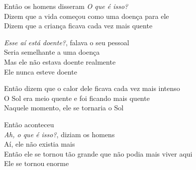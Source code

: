 \bigskip

\begin{linenumbers}\begingroup\raggedright
\noindent Então os homens disseram \emph{O que é isso?}\\
Dizem que a vida começou como uma doença para ele\\
Dizem que a criança ficava cada vez mais quente
\end{linenumbers}\endgroup

\bigskip

\begin{linenumbers}\begingroup\raggedright
\noindent \emph{Esse aí está doente?}, falava o seu pessoal\\
Seria semelhante a uma doença\\
Mas ele não estava doente realmente\\
Ele nunca esteve doente
\end{linenumbers}\endgroup

\bigskip

\begin{linenumbers}\begingroup\raggedright
\noindent Então dizem que o calor dele ficava cada vez mais intenso\\
O Sol era meio quente e foi ficando mais quente\\
Naquele momento, ele se tornaria o Sol
\end{linenumbers}\endgroup

\bigskip

\begin{linenumbers}\begingroup\raggedright
\noindent Então aconteceu\\
\emph{Ah, o que é isso?}, diziam os homens\\
Aí, ele não existia mais\\
Então ele se tornou tão grande que não podia mais viver aqui\\
Ele se tornou enorme
\end{linenumbers}\endgroup

